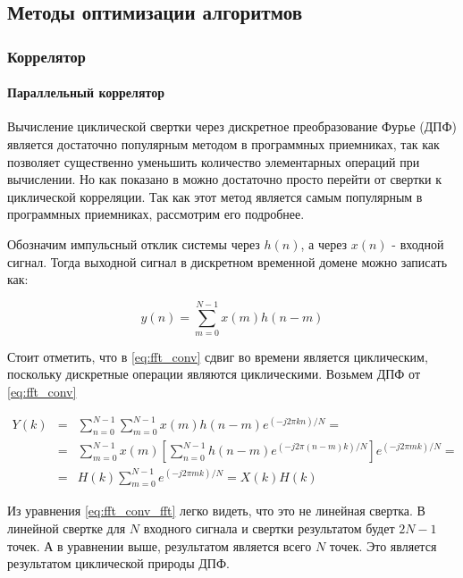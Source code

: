 \subsection{Методы оптимизации алгоритмов}
\subsubsection{Коррелятор}

\paragraph{Параллельный коррелятор}
\label{sec1_fft}
Вычисление циклической свертки через дискретное преобразование Фурье (ДПФ) является достаточно популярным методом
в программных приемниках, так как позволяет существенно 
уменьшить количество элементарных операций при вычислении. Но как показано в \cite{tsui, oppenheim} можно достаточно просто
перейти от свертки к циклической корреляции. Так как этот метод является самым популярным в программных приемниках, рассмотрим его
подробнее.

Обозначим импульсный отклик системы через $h(n)$, а через ${x(n)}$ - входной сигнал. Тогда выходной сигнал в дискретном
временной домене можно записать как:

\begin{equation}
	\label{eq:fft_conv}
	y(n)=\sum\limits_{m=0}^{N-1}{x(m)h(n-m)}
\end{equation}

Стоит отметить, что в \ref{eq:fft_conv} сдвиг во времени является циклическим, поскольку дискретные операции являются циклическими.
Возьмем ДПФ от \ref{eq:fft_conv}

\begin{center}
\begin{eqnarray}
	\label{eq:fft_conv_fft}
	Y(k) & = & \sum\limits_{n=0}^{N-1}\sum\limits_{m=0}^{N-1}{x(m)h(n-m)e^{(-j2\pi{kn})/N}}=\nonumber \\
	& = & \sum\limits_{m=0}^{N-1}{x(m)}[\sum\limits_{n=0}^{N-1}h(n-m)e^{(-j2\pi{(n-m)}k)/N}]e^{(-j2\pi{m}k)/N}=\\
	& = & H(k)\sum\limits_{m=0}^{N-1}e^{(-j2\pi{m}k)/N} = X(k)H(k)\nonumber 
\end{eqnarray}
\end{center}


Из уравнения \ref{eq:fft_conv_fft} легко видеть, что это не линейная свертка. В линейной свертке для $N$ входного
сигнала и свертки результатом будет $2N-1$ точек. А в уравнении выше, результатом является всего $N$ точек.
Это является результатом циклической природы ДПФ.

